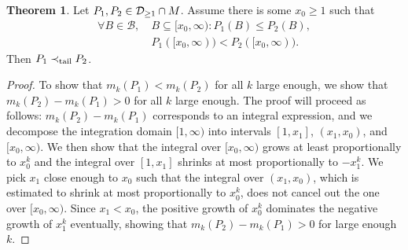 \documentclass[a4paper,DIV=11]{scrreprt}
\newcommand{\B}{\mathcal{B}}
\newcommand{\M}{M}
\theoremstyle{definition}
\newtheorem{thm}{Theorem}[chapter] %
\begin{document}
    \begin{thm}
        Let $P_1, P_2 \in \Dgeqone \cap \M$. Assume there is some $x_0 \geq 1$ such that
        \begin{align}
            \forall B \in \B, &~B \subseteq [x_0, \infty): P_1(B) \leq P_2(B)  \label{eq:p2DominatesP1LeftOfX0},  \\
            &~P_1([x_0, \infty)) < P_2([x_0, \infty)) \label{eq:p2StrictlyDominatesP1OnB0}.
        \end{align}
        Then $P_1 \prec_{\text{tail}} P_2$.
        \label{thm:tailOrderSufficientConditionsGeneral}
    \end{thm}    
    \begin{proof}
        To show that $m_k(P_1) < m_k(P_2)$ for all $k$ large enough, we show that $m_k(P_2) - m_k(P_1) > 0$ for all $k$ large enough.
        The proof will proceed as follows: $m_k(P_2) - m_k(P_1)$ corresponds to an integral expression, and we decompose the integration domain $[1, \infty)$ into intervals $[1, x_1]$, $(x_1, x_0)$, and $[x_0, \infty)$. We then show that the integral over $[x_0, \infty)$ grows at least proportionally to $x_0^k$ and the integral over $[1, x_1]$ shrinks at most proportionally to $-x_1^k$. We pick $x_1$ close enough to $x_0$ such that the integral over $(x_1, x_0)$, which is estimated to shrink at most proportionally to $x_0^k$, does not cancel out the one over $[x_0, \infty)$. Since $x_1 < x_0$, the positive growth of $x_0^k$ dominates the negative growth of $x_1^k$ eventually, showing that $m_k(P_2) - m_k(P_1) > 0$ for large enough $k$.
        

\end{proof}
\end{document}

